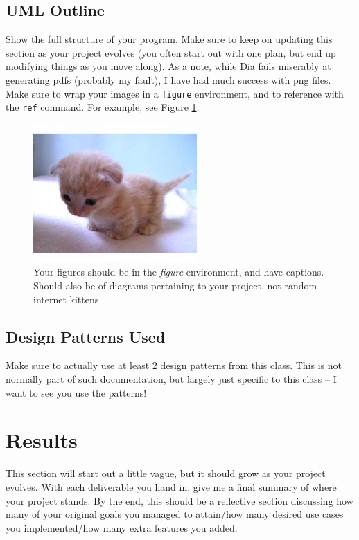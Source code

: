 \documentclass[10pt,conference,onecolumn,compsoc]{IEEEtran}
\begin{document}
\subsection{UML Outline}
Show the full structure of your program.  Make sure to keep on updating this section as your project evolves (you often start out with one plan, but end up modifying things as you move along).  As a note, while Dia fails miserably at generating pdfs (probably my fault), I have had much success with png files.  Make sure to wrap your images in a \texttt{figure} environment, and to reference with the \texttt{ref} command.  For example, see Figure \ref{cat2}.

\begin{figure}[ht!]
\includegraphics[scale=1.5]{cat2.jpg}
\caption{Your figures should be in the \emph{figure} environment, and have captions.  Should also be of diagrams pertaining to your project, not random internet kittens}
\label{cat2}
\end{figure}


\subsection{Design Patterns Used}
Make sure to actually use at least 2 design patterns from this class.  This is not normally part of such documentation, but largely just specific to this class -- I want to see you use the patterns!


\section{Results}
This section will start out a little vague, but it should grow as your project evolves.  With each deliverable you hand in, give me a final summary of where your project stands.  By the end, this should be a reflective section discussing how many of your original goals you managed to attain/how many desired use cases you implemented/how many extra features you added.
\end{document}
